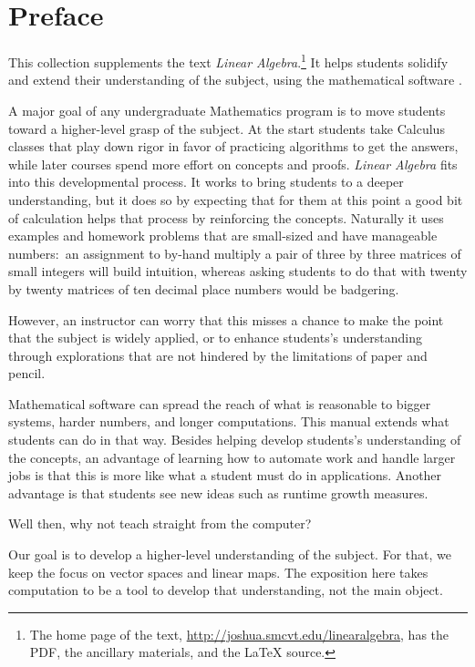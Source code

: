\chapter*{Preface}\pagestyle{preface}\thispagestyle{preface}
\setlength{\parskip}{.25ex}


This collection supplements the text \nocite{Hefferon12}
\textit{Linear Algebra}.\footnote{The home page of the text, 
\protect\url{http://joshua.smcvt.edu/linearalgebra}, 
has the PDF, the ancillary materials, and the \protect\LaTeX{} source.}
It helps students
solidify and extend their understanding of the subject, 
using the mathematical software \Sage{}.%

A major goal of any undergraduate Mathematics program is to move students 
toward a higher-level grasp of the subject.
At the start students take Calculus classes that play down 
rigor in favor of practicing algorithms to get the answers, while
later courses spend more effort on concepts and proofs.
\textit{Linear Algebra} fits into this developmental process.
It works to bring students to a deeper understanding, 
but it does so by expecting
that for them at this point a good bit of calculation helps that process
by reinforcing the concepts. 
Naturally it uses examples and homework problems
that are small-sized and have manageable numbers:~an 
assignment to by-hand multiply a pair of three by three matrices
of small integers will build intuition, whereas asking students to do that
with twenty by twenty matrices
of ten decimal place numbers would be badgering. 

However, an instructor can worry that this misses a chance
to make the point that the subject is widely applied,
or to enhance students's understanding through explorations that are not 
hindered by the limitations of paper and pencil. 

Mathematical software can spread the reach of
what is reasonable 
to bigger systems, harder numbers, and longer computations.
This manual extends what students can do in that way.
Besides helping develop students's understanding of the concepts,
an advantage of learning how to automate work and
handle larger jobs is that 
this is more like what a student must do in applications.
Another advantage is that students see new ideas such as 
runtime growth measures.

Well then, why 
not teach straight from the computer?

Our goal is to develop a higher-level understanding of the subject. 
For that, we keep the focus on vector spaces and linear maps.
The exposition here takes computation to be
a tool to develop that understanding, not the main object.

